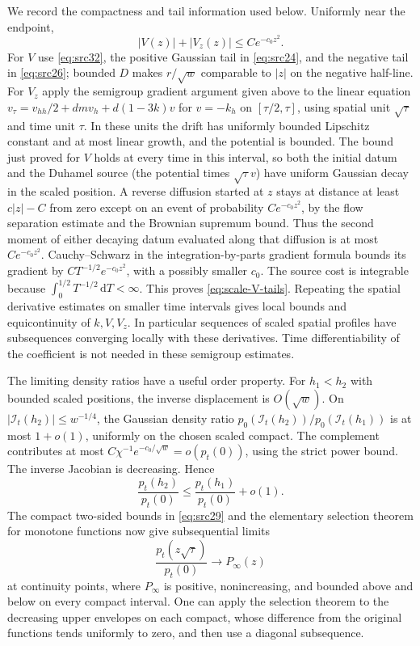 \documentclass[11pt,a4paper]{article}
\numberwithin{equation}{section}
\theoremstyle{definition}
\theoremstyle{remark}
\newcommand{\dd}{\mathrm d}
\begin{document}
We record the compactness and tail information used below. Uniformly
near the endpoint,
\begin{equation}\label{eq:scale-V-tails}
 |V(z)|+|V_z(z)|\le C e^{-c_0z^2}.
\end{equation}
For $V$ use \eqref{eq:src32}, the positive Gaussian tail in
\eqref{eq:src24}, and the negative tail in \eqref{eq:src26}; bounded
$D$ makes $r/\sqrt w$ comparable to $|z|$ on the negative half-line.
For $V_z$ apply the semigroup gradient argument given above to the
linear equation
$v_\tau=v_{hh}/2+dmv_h+d(1-3k)v$ for $v=-k_h$ on
$[\tau/2,\tau]$, using spatial unit $\sqrt\tau$ and time unit
$\tau$. In these units the drift has uniformly bounded Lipschitz
constant and at most linear growth, and the potential is bounded.
The bound just proved for $V$ holds at every time in this interval,
so both the initial datum and the Duhamel source (the potential times
$\sqrt\tau v$) have uniform Gaussian decay in the scaled position.
A reverse diffusion started at $z$ stays at distance at least
$c|z|-C$ from zero except on an event of probability
$Ce^{-c_0z^2}$, by the flow separation estimate and the Brownian
supremum bound. Thus the second moment of either decaying datum
evaluated along that diffusion is at most $Ce^{-c_0z^2}$.
Cauchy--Schwarz in the integration-by-parts gradient formula bounds
its gradient by $CT^{-1/2}e^{-c_0z^2}$, with a possibly smaller
$c_0$. The source cost is integrable because
$\int_0^{1/2}T^{-1/2}\,\dd T<\infty$.
This proves \eqref{eq:scale-V-tails}.
Repeating the spatial derivative estimates on smaller time intervals
gives local bounds and equicontinuity of $k,V,V_z$. In particular
sequences of scaled spatial profiles have subsequences converging
locally with these derivatives. Time differentiability of the
coefficient is not needed in these semigroup estimates.

The limiting density ratios have a useful order property. For
$h_1<h_2$ with bounded scaled positions, the inverse displacement is
$O(\sqrt w)$. On $|\mathcal I_t(h_2)|\le w^{-1/4}$, the Gaussian density ratio
$p_0(\mathcal I_t(h_2))/p_0(\mathcal I_t(h_1))$ is at most $1+o(1)$, uniformly on the
chosen scaled compact. The complement contributes at most
$C\chi^{-1}e^{-c_0/\sqrt w}=o(p_t(0))$, using the strict power
bound. The inverse Jacobian is decreasing. Hence
\[
 \frac{p_t(h_2)}{p_t(0)}\le
 \frac{p_t(h_1)}{p_t(0)}+o(1).
\]
The compact two-sided bounds in \eqref{eq:src29} and the elementary
selection theorem for monotone functions now give subsequential
limits
\begin{equation}\label{eq:scale-density-limit}
 \frac{p_t(z\sqrt\tau)}{p_t(0)}\longrightarrow P_\infty(z)
\end{equation}
at continuity points, where $P_\infty$ is positive, nonincreasing,
and bounded above and below on every compact interval. One can apply
the selection theorem to the decreasing upper envelopes on each
compact, whose difference from the original functions tends uniformly
to zero, and then use a diagonal subsequence.
\end{document}
